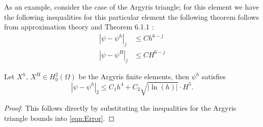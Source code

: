 As an example, consider the case of the Argyris triangle; for this element we have the following inequalities
for this particular element the following theorem follows from approximation theory \cite{Bernadou94} and Theorem 6.1.1 \cite{Ciarlet}:
\begin{align*}
  |\psi - \psi^h|_j &\le Ch^{6-j} \\
  |\psi - \psi^H|_j &\le CH^{6-j}
\end{align*}
\begin{corollary} \label{crl:Argyris2L}
  Let $X^h,\, X^H \in H^2_0(\Omega)$ be the Argyris finite elements, then $\psi^h$ satisfies
  \begin{equation}
    |\psi - \psi^h|_2 \le C_1 h^4 + C_2 \sqrt{|\ln(h)|}\cdot H^5.
    \label{eqn:TwoLevelError}
  \end{equation}
\end{corollary}
\begin{proof}
  This follows directly by substituting the inequalities for the Argyris triangle bounds into \eqref{eqn:Error}.
\end{proof}
